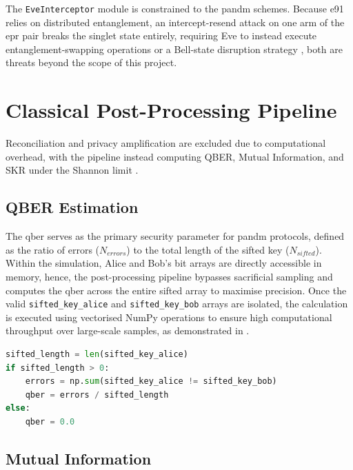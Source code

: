 \documentclass[11pt, a4paper]{report}
\begin{document}
The \texttt{EveInterceptor} module is constrained to the \gls{pandm} schemes. Because \gls{e91} relies on distributed \gls{entanglement}, an intercept-resend attack on one arm of the \gls{epr} pair breaks the singlet state entirely, requiring Eve to instead execute \gls{entanglement}-swapping operations or a Bell-state disruption strategy \cite{E91}, both are threats beyond the scope of this project.



\newpage
\section{Classical Post-Processing Pipeline}
\label{sec:postprocessing}

Reconciliation and privacy amplification are excluded due to computational overhead, with the pipeline instead computing QBER, Mutual Information, and SKR under the Shannon limit \cite{Shannon1948}.


\subsection{QBER Estimation}
\label{subsec:QBER}

The \gls{qber} serves as the primary security parameter for \gls{pandm} protocols, defined as the ratio of errors ($N_{errors}$) to the total length of the sifted key ($N_{sifted}$). Within the simulation, Alice and Bob's bit arrays are directly accessible in memory, hence, the post-processing pipeline bypasses sacrificial sampling and computes the \gls{qber} across the entire sifted array to maximise precision. Once the valid \texttt{sifted\_key\_alice} and \texttt{sifted\_key\_bob} arrays are isolated, the calculation is executed using vectorised NumPy operations to ensure high computational throughput over large-scale samples, as demonstrated in .

\begin{lstlisting}[language=Python, caption={Vectorised QBER Calculation Logic.}, label={lst:qber_calc}]
sifted_length = len(sifted_key_alice)
if sifted_length > 0:
    errors = np.sum(sifted_key_alice != sifted_key_bob)
    qber = errors / sifted_length
else:
    qber = 0.0
\end{lstlisting}
\subsection{Mutual Information}
\label{subsec:mutualinfo}
\end{document}
